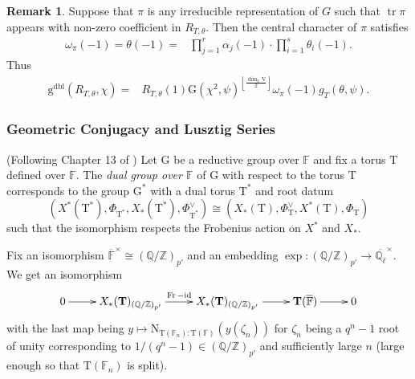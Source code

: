 \documentclass[12pt, reqno]{amsart}
\theoremstyle{definition}
\theoremstyle{definition}
\newtheorem{remark}[theorem]{Remark}
\theoremstyle{definition}
\newcommand{\multiplicativegroup}[1]{#1^{\times}}
\newcommand{\idmap}{\mathrm{id}}
\newcommand{\hermitianSpace}{\mathrm{V}}
\newcommand{\fieldCharacter}{\psi}
\newcommand{\centralCharacter}[1]{\omega_{#1}}
\newcommand{\trace}{\operatorname{tr}}
\newcommand{\aFieldNorm}{\mathrm{N}}
\newcommand{\finiteField}{\mathbb{F}}
\newcommand{\quadraticExtension}{\mathbb{E}}
\newcommand{\finiteFieldExtension}[1]{\finiteField_{#1}}
\newcommand{\algebraicClosure}[1]{\overline{#1}}
\newcommand{\Frobenius}{\operatorname{Fr}}
\newcommand{\GaussSumScalar}[2]{\mathrm{G}\left(#1, #2\right)}
\newcommand{\dblVirtualGaussSumScalar}[2]{\mathrm{g}^{\mathrm{dbl}}\left(#1, #2\right)}
\newcommand{\algebraicGroup}[1]{\boldsymbol{\mathrm{#1}}}
\begin{document}
\begin{remark}
	Suppose that $\pi$ is any irreducible representation of $G$ such that $\trace \pi$ appears with non-zero coefficient in $R_{T,\theta}$. Then the central character of $\pi$ satisfies
	\begin{align*}
		\centralCharacter{\pi}\left(-1\right) = \theta\left(-1\right) =& \prod_{j=1}^r \alpha_j\left(-1\right) \cdot \prod_{i=1}^s \theta_i\left(-1\right).
	\end{align*}
	Thus \begin{align*}
		\dblVirtualGaussSumScalar{R_{T, \theta}}{\chi} =& R_{T,\theta}\left(1\right) \GaussSumScalar{\chi^2}{\fieldCharacter}^{\left\lfloor\frac{\dim_{\quadraticExtension} \hermitianSpace}{2}\right\rfloor} \centralCharacter{\pi}\left(-1\right) g_T\left(\theta, \fieldCharacter\right).
	\end{align*}
\end{remark}

\subsubsection{Geometric Conjugacy and Lusztig Series}
(Following Chapter 13 of \cite{DigneMichel2020})
Let $\algebraicGroup{G}$ be a reductive group over $\finiteField$ and fix a torus $\algebraicGroup{T}$ defined over $\finiteField$. The \emph{dual group over $\finiteField$} of $\algebraicGroup{G}$ with respect to the torus $\algebraicGroup{T}$ corresponds to the group $\algebraicGroup{G}^*$ with a dual torus $\algebraicGroup{T}^*$ and root datum
\[
    (X^*(\algebraicGroup{T}^*),\Phi_{\algebraicGroup{T}^*},X_*(\algebraicGroup{T}^*),\Phi_{\algebraicGroup{T}^*}^\vee) \cong (X_*(\algebraicGroup{T}),\Phi_{\algebraicGroup{T}}^\vee,X^*(\algebraicGroup{T}),\Phi_{\algebraicGroup{T}})
\]
such that the isomorphism respects the Frobenius action on $X^*$ and $X_*$.

Fix an isomorphism $\multiplicativegroup{\algebraicClosure{\finiteField}} \cong (\mathbb{Q}/\mathbb{Z})_{p'}$ and an embedding $\exp:(\mathbb{Q}/\mathbb{Z})_{p'} \to \overline{\mathbb{Q}_\ell}^\times$. 
We get an isomorphism
\begin{equation}
\label{eq:DL}
\xymatrix{0 \ar[r] & X_*(\algebraicGroup{T})_{(\mathbb{Q}/\mathbb{Z})_{p'}} \ar[r]^{\Frobenius-\idmap} & X_*(\algebraicGroup{T})_{(\mathbb{Q}/\mathbb{Z})_{p'}} \ar[r] & \algebraicGroup{T}(\algebraicClosure{\finiteField}) \ar[r] & 0}
\end{equation}
with the last map being $y \mapsto \aFieldNorm_{\algebraicGroup{T}(\finiteFieldExtension{n}):\algebraicGroup{T}(\finiteField)}(y(\zeta_n))$
for $\zeta_n$ being a $q^n-1$ root of unity corresponding to $1/(q^n-1) \in (\mathbb{Q}/\mathbb{Z})_{p'}$ and sufficiently large $n$ (large enough so that $\algebraicGroup{T}\left(\finiteFieldExtension{n}\right)$ is split).
\end{document}
